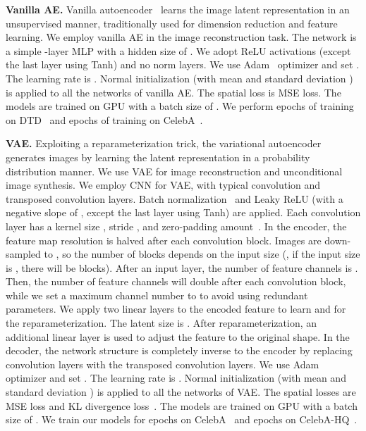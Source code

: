 \documentclass[10pt,twocolumn,letterpaper]{article}
\begin{document}
\vspace{0.1cm}
\noindent
\textbf{Vanilla AE.}
Vanilla autoencoder~\cite{ae} learns the image latent representation in an unsupervised manner, traditionally used for dimension reduction and feature learning.
We employ vanilla AE in the image reconstruction task.
The network is a simple -layer MLP with a hidden size of . We adopt ReLU activations (except the last layer using Tanh) and no norm layers.
We use Adam~\cite{adam} optimizer and set . The learning rate is . Normal initialization (with mean  and standard deviation ) is applied to all the networks of vanilla AE.
The spatial loss is MSE loss.
The models are trained on  GPU with a batch size of .
We perform  epochs of training on DTD~\cite{DTD} and  epochs of training on CelebA~\cite{celeba}.


\vspace{0.1cm}
\noindent
\textbf{VAE.}
Exploiting a reparameterization trick, the variational autoencoder~\cite{vae} generates images by learning the latent representation in a probability distribution manner.
We use VAE for image reconstruction and unconditional image synthesis.
We employ CNN for VAE, with typical convolution and transposed convolution layers. Batch normalization~\cite{BN} and Leaky ReLU (with a negative slope of , except the last layer using Tanh) are applied. Each convolution layer has a kernel size , stride , and zero-padding amount~.
In the encoder, the feature map resolution is halved after each convolution block. Images are down-sampled to , so the number of blocks depends on the input size (\eg, if the input size is , there will be  blocks). After an input layer, the number of feature channels is . Then, the number of feature channels will double after each convolution block, while we set a maximum channel number to  to avoid using redundant parameters.
We apply two linear layers to the encoded feature to learn  and  for the reparameterization. The latent size is . After reparameterization, an additional linear layer is used to adjust the feature to the original shape.
In the decoder, the network structure is completely inverse to the encoder by replacing convolution layers with the transposed convolution layers.
We use Adam~\cite{adam} optimizer and set . The learning rate is . Normal initialization (with mean  and standard deviation ) is applied to all the networks of VAE.
The spatial losses are MSE loss and KL divergence loss~\cite{vae}.
The models are trained on  GPU with a batch size of .
We train our models for  epochs on CelebA~\cite{celeba} and  epochs on CelebA-HQ~\cite{pggan}.
\end{document}

